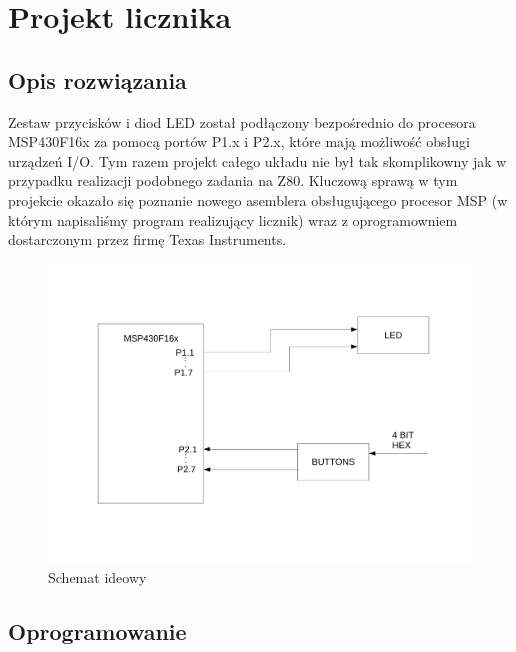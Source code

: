 \documentclass[a4paper,titlepage,11pt,floatssmall]{mwrep}
\begin{document}


\chapter{Projekt licznika}
\section{Opis rozwiązania}
\indent{} Zestaw przycisków i diod LED został podłączony bezpośrednio do procesora MSP430F16x za pomocą portów P1.x i P2.x, które mają możliwość obsługi urządzeń I/O. Tym razem projekt całego układu nie był tak skomplikowny jak w przypadku realizacji podobnego zadania na Z80. Kluczową sprawą w tym projekcie okazało się poznanie nowego asemblera obsługującego procesor MSP (w którym napisaliśmy program realizujący licznik) wraz z oprogramowniem dostarczonym przez firmę Texas Instruments.

\begin{figure}[th]
\centering
\includegraphics[width=\textwidth]{ideowy}
\caption{Schemat ideowy}
\end{figure}

\section{Oprogramowanie}
\end{document}

